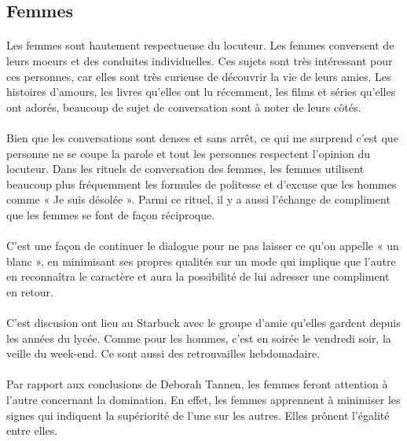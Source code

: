 \subsection{Femmes}
\paragraph{}
Les femmes sont hautement respectueuse du locuteur. Les femmes conversent de leurs moeurs et des
conduites individuelles. Ces sujets sont très intéressant pour ces personnes, car elles sont très curieuse de
découvrir la vie de leurs amies. Les histoires d'amours, les livres qu'elles ont lu récemment, les films et séries
qu'elles ont adorés, beaucoup de sujet de conversation sont à noter de leurs côtés.

\paragraph{}
Bien que les conversations sont denses et sans arrêt, ce qui me surprend c'est que personne ne se coupe la
parole et tout les personnes respectent l'opinion du locuteur. Dans les rituels de conversation des femmes, les
femmes utilisent beaucoup plus fréquemment les formules de politesse et d'excuse que les hommes comme
« Je suis désolée ». Parmi ce rituel, il y a aussi l'échange de compliment que les femmes se font de façon
réciproque.

\paragraph{}
C'est une façon de continuer le dialogue pour ne pas laisser ce qu'on appelle « un blanc », en minimisant ses
propres qualités sur un mode qui implique que l'autre en reconnaîtra le caractère et aura la possibilité de lui
adresser une compliment en retour.

\paragraph{}
C'est discusion ont lieu au Starbuck avec le groupe d'amie qu'elles gardent depuis les années du lycée.
Comme pour les hommes, c'est en soirée le vendredi soir, la veille du week-end. Ce sont aussi des
retrouvailles hebdomadaire.

\paragraph{}
Par rapport aux conclusions de Deborah Tannen, les femmes feront attention à l'autre concernant la
domination. En effet, les femmes apprennent à minimiser les signes qui indiquent la supériorité de l'une sur
les autres. Elles prônent l'égalité entre elles.

